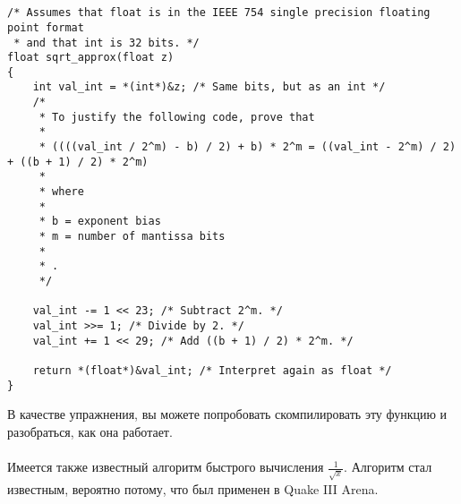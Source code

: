 \section{}





\subsection{}

%

\begin{lstlisting}[caption=\EN{The source code is taken from Wikipedia}\RU{Исходный код взят из Wikipedia}: \url{http://go.yurichev.com/17364}]
/* Assumes that float is in the IEEE 754 single precision floating point format
 * and that int is 32 bits. */
float sqrt_approx(float z)
{
    int val_int = *(int*)&z; /* Same bits, but as an int */
    /*
     * To justify the following code, prove that
     *
     * ((((val_int / 2^m) - b) / 2) + b) * 2^m = ((val_int - 2^m) / 2) + ((b + 1) / 2) * 2^m)
     *
     * where
     *
     * b = exponent bias
     * m = number of mantissa bits
     *
     * .
     */
 
    val_int -= 1 << 23; /* Subtract 2^m. */
    val_int >>= 1; /* Divide by 2. */
    val_int += 1 << 29; /* Add ((b + 1) / 2) * 2^m. */
 
    return *(float*)&val_int; /* Interpret again as float */
}
\end{lstlisting}

\ifdefined\RUSSIAN
В качестве упражнения, вы можете попробовать скомпилировать эту функцию и разобраться, как она работает. \\
\\
Имеется также известный алгоритм быстрого вычисления $\frac{1}{\sqrt{x}}$.
Алгоритм стал известным, вероятно потому, что был применен в Quake III Arena.

